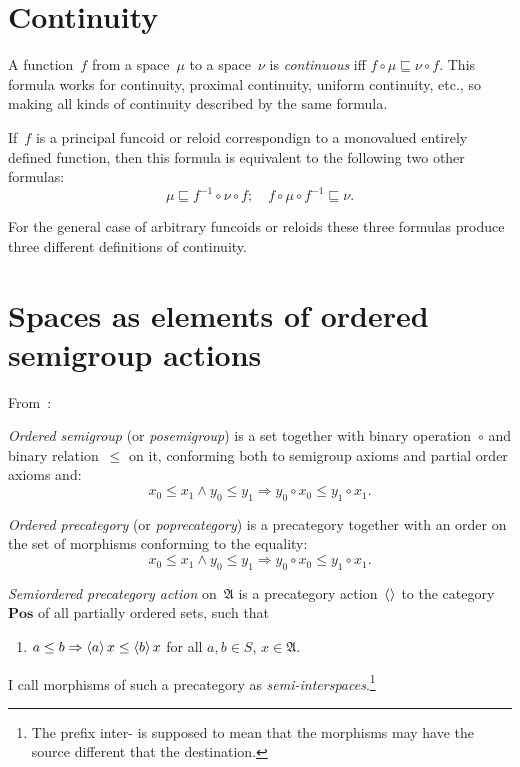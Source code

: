 \documentclass{amsart}
\begin{document}
\section{Continuity}

A function~$f$ from a space~$\mu$ to a space~$\nu$ is \emph{continuous} iff
$f\circ\mu\sqsubseteq \nu\circ f$. This formula works for continuity, proximal continuity,
uniform continuity, etc., so making all kinds of continuity described by the same formula.

If~$f$ is a principal funcoid or reloid correspondign to a monovalued entirely defined function, then this formula is
equivalent to the following two other formulas:
\[ \mu\sqsubseteq f^{-1}\circ\nu\circ f;\quad
f\circ\mu\circ f^{-1}\sqsubseteq \nu. \]

For the general case of arbitrary funcoids or reloids these three formulas produce three different definitions of continuity.

\section{Spaces as elements of ordered semigroup actions}

From~\cite{volume-3}:

\begin{defn}
\emph{Ordered semigroup} (or \emph{posemigroup}) is a set together with binary operation~$\circ$ and binary relation~$\leq$ on it, conforming both to semigroup axioms and partial order axioms and:
\[ x_0\leq x_1\land y_0\leq y_1\Rightarrow y_0\circ x_0\leq y_1\circ x_1. \]
\end{defn}

\begin{defn}
\emph{Ordered precategory} (or \emph{poprecategory}) is
a precategory together with an order on the set of morphisms conforming to the equality:
\[ x_0\leq x_1\land y_0\leq y_1\Rightarrow y_0\circ x_0\leq y_1\circ x_1. \]
\end{defn}

\begin{defn}
\emph{Semiordered precategory action} on~$\mathfrak{A}$ is a precategory action~$\left\langle \right\rangle$ to the category~$\mathbf{Pos}$ of all partially ordered sets, such that
\begin{enumerate}
\item $a\leq b\Rightarrow\left\langle a\right\rangle x\leq \left\langle b\right\rangle x$ for all $a,b\in S$, $x\in\mathfrak{A}$.
\end{enumerate}
I call morphisms of such a precategory as \emph{semi-interspaces}.\footnote{The prefix inter- is supposed to mean that the morphisms may have the source different that the destination.}
\end{defn}
\end{document}
